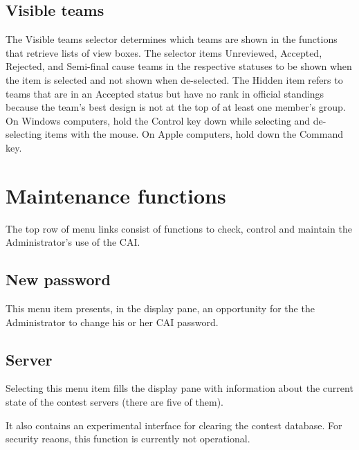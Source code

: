 \documentclass[11pt,letterpaper]{refart}
\def\ui#1{\textsf{#1}}
\begin{document}
\subsection{Visible teams}
The \ui{Visible teams} selector determines which teams are shown in
the functions that retrieve lists of view boxes. The selector items
\ui{Unreviewed}, \ui{Accepted}, \ui{Rejected}, and \ui{Semi-final}
cause teams in the respective statuses to be shown when the item is
selected and not shown when de-selected. The \ui{Hidden} item refers
to teams that are in an \ui{Accepted} status but have no rank in
official standings because the team's best design is not at the
top of at least one member's group. On Windows computers, hold the
Control key down while selecting and de-selecting items with the mouse.
On Apple computers, hold down the Command key.

\section{Maintenance functions}
The top row of menu links consist of functions to check, control and
maintain the Administrator's use of the CAI.

\subsection{New password}
This menu item presents, in the display pane, an opportunity for the
the Administrator to change his or her CAI password.

\subsection{Server}
Selecting this menu item fills the display pane with information about
the current state of the contest servers (there are five of them).

It also contains an experimental interface for clearing the contest
database. For security reaons, this function is currently not
operational.
\end{document}
